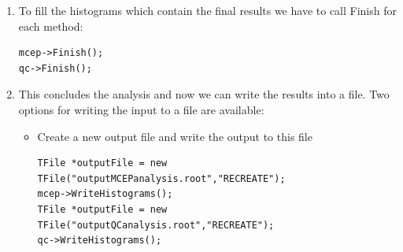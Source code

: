 \documentclass[a4paper]{book}
\numberwithin{equation}{subsection}
\begin{document}
\begin{enumerate}
	We do this in an event loop. First define the number of events that need to be created, their multiplicity, and a value $v_2$ value, which can either be supplied as a fixed number (no $p_t$ dependence) of a function (to generate $p_t$ differential flow\footnote{The on the fly event generator is not limited to the generation of the second harmonic $v_2$, but to get started, this is a nice example}
	
	\begin{lstlisting}
	Int_t nEvents = 1000;	// generate 1000 events
	Int_t mult = 2000;		// use track multiplicity of 2000
	Double_t v2 = .05;		// 5 pct integrated flow
	// or sample differential flow
	TF1* diffv2 = new TF1("diffv2", "((x<1.)*(0.1/1.)*x+(x>=1.)*0.1)", 0., 20.); \end{lstlisting}
	
Now we have all the ingredients to our first flow analysis	
	
	\begin{lstlisting}
// make an event with mult particles 
AliFlowEventSimple* event = new AliFlowEventSimple(mult,AliFlowEventSimple::kGenerate);
// modify the tracks adding the flow value v2
event->AddV2(diffv2);
for(Int_t i=0; i<nEvts; i++) { 
      // select the particles for the reference flow
      event->TagRP(cutsRP);
      // select the particles for differential flow
      event->TagPOI(cutsPOI);
      // do flow analysis with various methods:
      mcep->Make(event);
      qc->Make(event);
      // reset the event so we can re-use the allocated memory
      event->ClearFast();
      // fill the event with a fresh set of tracks
      event->Generate(mult);
} \end{lstlisting}
	\item To fill the histograms which contain the final results we have to call Finish for each method:
	\begin{lstlisting}
mcep->Finish(); 
qc->Finish(); \end{lstlisting}
	\item This concludes the analysis and now we can write the results into a file. Two options for writing the input to a file are available: 
     \begin{itemize}
     \item Create a new output file and write the output to this file
     \begin{lstlisting}
TFile *outputFile = new TFile("outputMCEPanalysis.root","RECREATE");
mcep->WriteHistograms();
TFile *outputFile = new TFile("outputQCanalysis.root","RECREATE");
qc->WriteHistograms();
\end{lstlisting}


\end{itemize}
\end{enumerate}
\end{document}
